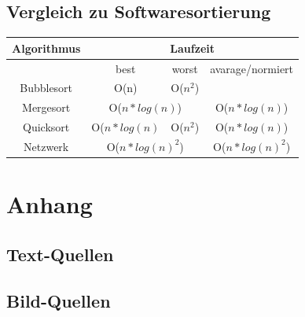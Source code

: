 \documentclass[11pt]{article}
\begin{document}
\subsection{Vergleich zu Softwaresortierung}
\begin{center}
	\begin{tabular}{c|c|c|c}
		Algorithmus & \multicolumn{3}{|c}{Laufzeit} \\ \hline
		& best & worst & avarage/normiert \\ \cline{2-4}
		Bubblesort & O(n) & O($n^2$) & \\
		Mergesort & \multicolumn{2}{|c|}{O($n * log(n)$)} & {O($n * log(n)$)} \\ 
		Quicksort & {O($n * log(n)$} & O($n^2$) & {O($n * log(n)$)} \\
		Netzwerk & \multicolumn{2}{|c|}{O($n * log(n)^2$)} & O($n * log(n)^2$) \\
	\end{tabular}
	
\end{center}
\section{Anhang}
\subsection{Text-Quellen}
\subsection{Bild-Quellen}
\end{document}
